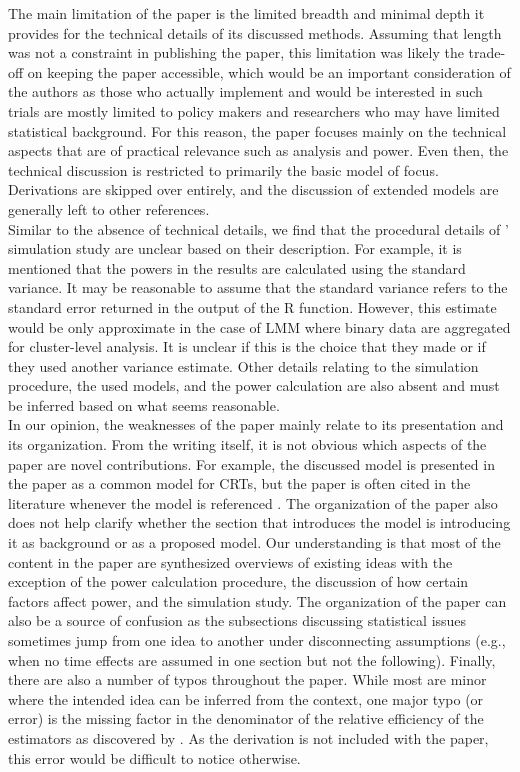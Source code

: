\documentclass[10pt]{article}
\begin{document}
The main limitation of the paper is the limited breadth and minimal depth it provides for the technical details of its discussed methods. Assuming that length was not a constraint in publishing the paper, this limitation was likely the trade-off on keeping the paper accessible, which would be an important consideration of the authors as those who actually implement and would be interested in such trials are mostly limited to policy makers and researchers who may have limited statistical background. For this reason, the paper focuses mainly on the technical aspects that are of practical relevance such as analysis and power. Even then, the technical discussion is restricted to primarily the basic model of focus. Derivations are skipped over entirely, and the discussion of extended models are generally left to other references.
\\

Similar to the absence of technical details, we find that the procedural details of \citeauthor{Hussey:2007}' simulation study are unclear based on their description. For example, it is mentioned that the powers in the results are calculated using the standard variance. It may be reasonable to assume that the standard variance refers to the standard error returned in the output of the R function. However, this estimate would be only approximate in the case of LMM where binary data are aggregated for cluster-level analysis. It is unclear if this is the choice that they made or if they used another variance estimate. Other details relating to the simulation procedure, the used models, and the power calculation are also absent and must be inferred based on what seems reasonable.
\\

In our opinion, the weaknesses of the paper mainly relate to its presentation and its organization. From the writing itself, it is not obvious which aspects of the paper are novel contributions. For example, the discussed model is presented in the paper as a common model for CRTs, but the paper is often cited in the literature whenever the model is referenced \parencite[e.g.,][]{Harrison:2020,Bowden:2021,DavisPlourde:2021}. The organization of the paper also does not help clarify whether the section that introduces the model is introducing it as background or as a proposed model. Our understanding is that most of the content in the paper are synthesized overviews of existing ideas with the exception of the power calculation procedure, the discussion of how certain factors affect power, and the simulation study. The organization of the paper can also be a source of confusion as the subsections discussing statistical issues sometimes jump from one idea to another under disconnecting assumptions (e.g., when no time effects are assumed in one section but not the following). Finally, there are also a number of typos throughout the paper. While most are minor where the intended idea can be inferred from the context, one major typo (or error) is the missing factor in the denominator of the relative efficiency of the estimators as discovered by \textcite{Liao:2015}. As the derivation is not included with the paper, this error would be difficult to notice otherwise.
\\
\end{document}
